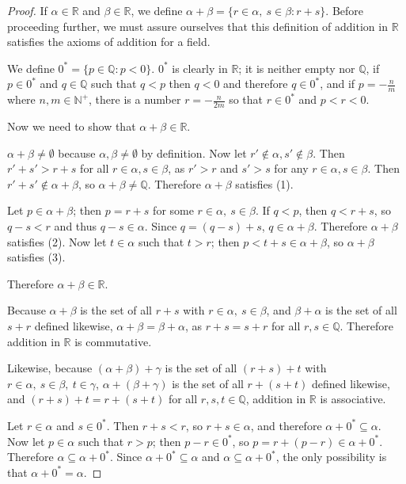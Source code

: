 \documentclass[12pt]{article}
\begin{document}
\begin{thm}
\begin{proof}
    If $\alpha \in \mathbb{R}$ and $\beta \in \mathbb{R}$, we define $\alpha + \beta
    = \{r \in \alpha,\ s \in \beta: r + s\}$. Before proceeding further, we must
    assure ourselves that this definition of addition in $\mathbb{R}$ satisfies the
    axioms of addition for a field.

    We define $0^* = \{p \in \mathbb{Q}: p < 0\}$. $0^*$ is clearly in $\mathbb{R}$;
    it is neither empty nor $\mathbb{Q}$, if $p \in 0^*$ and $q \in \mathbb{Q}$ such
    that $q < p$ then $q < 0$ and therefore $q \in 0^*$, and if $p = -\frac{n}{m}$
    where $n,m \in \mathbb{N}^+$, there is a number $r = -\frac{n}{2m}$ so that $r
    \in 0^*$ and $p < r < 0$.

    Now we need to show that $\alpha + \beta \in \mathbb{R}$.

    $\alpha + \beta \neq \emptyset$ because $\alpha,\beta \neq \emptyset$ by
    definition. Now let $r' \notin \alpha, s' \notin \beta$. Then $r' + s' > r + s$
    for all $r \in \alpha, s \in \beta$, as $r' > r$ and $s' > s$ for any $r \in
    \alpha, s \in \beta$. Then $r' + s' \notin \alpha + \beta$, so $\alpha + \beta
    \neq \mathbb{Q}$. Therefore $\alpha + \beta$ satisfies (1).

    Let $p \in \alpha + \beta$; then $p = r + s$ for some $r \in \alpha,\ s \in
    \beta$. If $q < p$, then $q < r + s$, so $q - s < r$ and thus $q - s \in \alpha$.
    Since $q = (q - s) + s$, $q \in \alpha + \beta$. Therefore $\alpha + \beta$
    satisfies (2). Now let $t \in \alpha$ such that $t > r$; then $p < t + s \in
    \alpha + \beta$, so $\alpha + \beta$ satisfies (3).

    Therefore $\alpha + \beta \in \mathbb{R}$.

    Because $\alpha + \beta$ is the set of all $r + s$ with $r \in \alpha,\ s \in
    \beta$, and $\beta + \alpha$ is the set of all $s + r$ defined likewise, $\alpha
    + \beta = \beta + \alpha$, as $r + s = s + r$ for all $r,s \in \mathbb{Q}$.
    Therefore addition in $\mathbb{R}$ is commutative.

    Likewise, because $(\alpha + \beta) + \gamma$ is the set of all $(r + s) + t$
    with $r \in \alpha,\ s \in \beta,\ t \in \gamma$, $\alpha + (\beta + \gamma)$
    is the set of all $r + (s + t)$ defined likewise, and $(r + s) + t = r + (s + t)$
    for all $r,s,t \in \mathbb{Q}$, addition in $\mathbb{R}$ is associative.

    Let $r \in \alpha$ and $s \in 0^*$. Then $r + s < r$, so $r + s \in \alpha$, and
    therefore $\alpha + 0^* \subseteq \alpha$. Now let $p \in \alpha$ such that $r >
    p$; then $p - r \in 0^*$, so $p = r + (p - r) \in \alpha + 0^*$. Therefore
    $\alpha \subseteq \alpha + 0^*$. Since $\alpha + 0^* \subseteq \alpha$ and
    $\alpha \subseteq \alpha + 0^*$, the only possibility is that $\alpha + 0^* =
    \alpha$.


\end{proof}
\end{thm}
\end{document}
